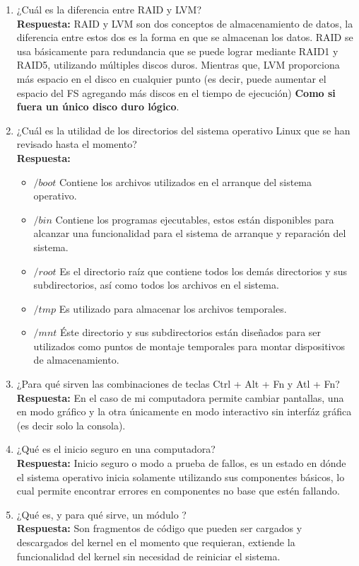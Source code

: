 \documentclass[a4paper, 11pt, oneside]{article}
\begin{document}
\begin{enumerate}
    \item ¿Cuál es la diferencia entre RAID y LVM?\\
    \textbf{Respuesta:} 
    RAID y LVM son dos conceptos de almacenamiento de datos, la diferencia entre estos dos es la forma en que se almacenan los datos.
    RAID se usa básicamente para redundancia  que se puede lograr mediante RAID1 y RAID5, utilizando múltiples discos duros. Mientras que, LVM proporciona más espacio en el disco en cualquier punto (es decir, puede aumentar el espacio del FS agregando más discos en el tiempo de ejecución) \textbf{Como
    si fuera un único disco duro lógico}.
    
    \item ¿Cuál es la utilidad de los directorios del sistema operativo Linux que se han
    revisado hasta el momento?\\
    \textbf{Respuesta:}
    \begin{itemize}
        \item $/boot$ Contiene los archivos utilizados en el arranque del sistema operativo.
        \item $/bin$ Contiene los programas ejecutables, estos están disponibles para alcanzar una funcionalidad para el sistema de arranque y reparación del sistema.
        \item $/root$ Es el directorio raíz que contiene todos los demás directorios y sus subdirectorios, así como todos los archivos en el sistema.
        \item $/tmp$ Es utilizado para almacenar los archivos temporales.
        \item $/mnt$ Éste directorio y sus subdirectorios están diseñados para ser utilizados como puntos de montaje temporales para montar dispositivos de almacenamiento.
    \end{itemize}
    \item ¿Para qué sirven las combinaciones de teclas Ctrl + Alt + Fn y Atl + Fn?\\
    \textbf{Respuesta:} En el caso de mi computadora permite cambiar pantallas, una en modo gráfico y la otra únicamente en modo interactivo sin interfáz gráfica (es decir solo la consola).
    \item ¿Qué es el inicio seguro en una computadora?\\
    \textbf{Respuesta:} Inicio seguro o modo a prueba de fallos, es un estado en dónde el sistema operativo inicia solamente utilizando sus componentes básicos, lo cual permite encontrar errores en componentes no base que estén fallando.
    \item ¿Qué es, y para qué sirve, un módulo ?\\
    \textbf{Respuesta:} Son fragmentos de código que pueden ser cargados y descargados del kernel en el momento que requieran, extiende la funcionalidad del kernel sin necesidad de reiniciar el sistema.
\end{enumerate}
\end{document}

